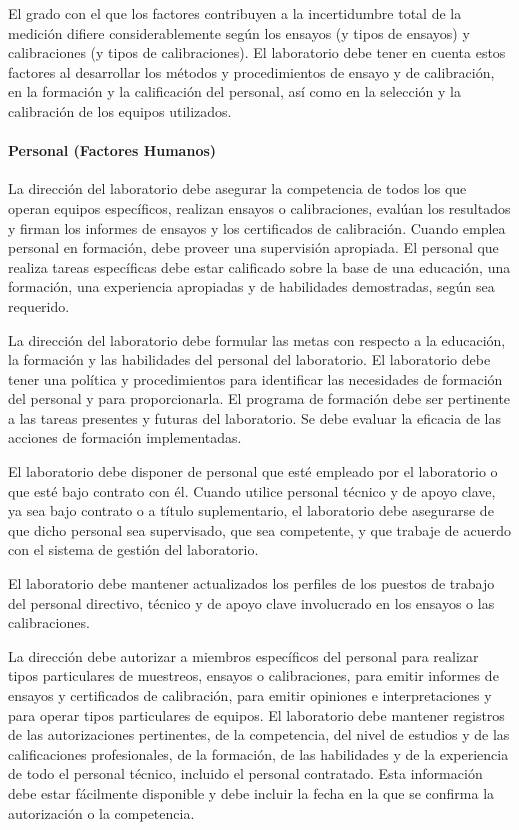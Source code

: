 \par \noindent
El grado con el que los factores contribuyen a la incertidumbre total de la medición difiere
considerablemente según los ensayos (y tipos de ensayos) y calibraciones (y tipos de calibraciones). El
laboratorio debe tener en cuenta estos factores al desarrollar los métodos y procedimientos de ensayo y de
calibración, en la formación y la calificación del personal, así como en la selección y la calibración de los
equipos utilizados.

\paragraph{Personal (Factores Humanos)}
La dirección del laboratorio debe asegurar la competencia de todos los que operan equipos
específicos, realizan ensayos o calibraciones, evalúan los resultados y firman los informes de ensayos y los
certificados de calibración. Cuando emplea personal en formación, debe proveer una supervisión apropiada.
El personal que realiza tareas específicas debe estar calificado sobre la base de una educación, una
formación, una experiencia apropiadas y de habilidades demostradas, según sea requerido.

\par \noindent
La dirección del laboratorio debe formular las metas con respecto a la educación, la formación y las
habilidades del personal del laboratorio. El laboratorio debe tener una política y procedimientos para
identificar las necesidades de formación del personal y para proporcionarla. El programa de formación debe
ser pertinente a las tareas presentes y futuras del laboratorio. Se debe evaluar la eficacia de las acciones de
formación implementadas.

\par \noindent
El laboratorio debe disponer de personal que esté empleado por el laboratorio o que esté bajo
contrato con él. Cuando utilice personal técnico y de apoyo clave, ya sea bajo contrato o a título
suplementario, el laboratorio debe asegurarse de que dicho personal sea supervisado, que sea competente, y
que trabaje de acuerdo con el sistema de gestión del laboratorio.

\par \noindent
El laboratorio debe mantener actualizados los perfiles de los puestos de trabajo del personal directivo,
técnico y de apoyo clave involucrado en los ensayos o las calibraciones.

\par \noindent
La dirección debe autorizar a miembros específicos del personal para realizar tipos particulares
de muestreos, ensayos o calibraciones, para emitir informes de ensayos y certificados de calibración, para
emitir opiniones e interpretaciones y para operar tipos particulares de equipos. El laboratorio debe mantener
registros de las autorizaciones pertinentes, de la competencia, del nivel de estudios y de las calificaciones
profesionales, de la formación, de las habilidades y de la experiencia de todo el personal técnico, incluido el
personal contratado. Esta información debe estar fácilmente disponible y debe incluir la fecha en la que se
confirma la autorización o la competencia.

